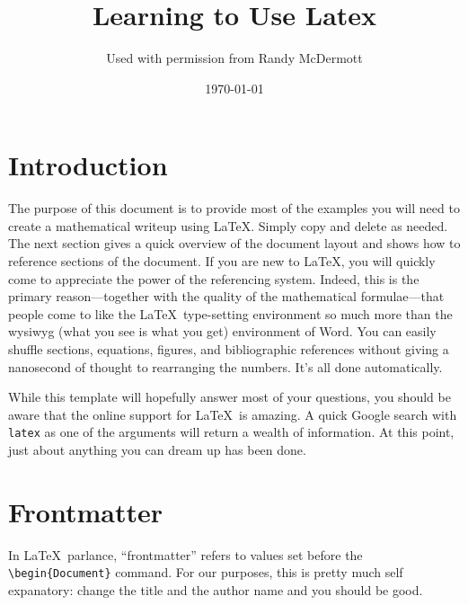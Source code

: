 \documentclass[12pt,letterpaper]{article}
\title{Learning to Use Latex}
\author{Used with permission from Randy McDermott}
\date{\today}
\begin{document}
\maketitle

\section{Introduction}
\label{sec:intro}

The purpose of this document is to provide most of the examples you will need to create a mathematical writeup using \LaTeX.  Simply copy and delete as needed.  The next section gives a quick overview of the document layout and shows how to reference sections of the document.  If you are new to \LaTeX, you will quickly come to appreciate the power of the referencing system.  Indeed, this is the primary reason---together with the quality of the mathematical formulae---that people come to like the \LaTeX~type-setting environment so much more than the wysiwyg (what you see is what you get) environment of Word.  You can easily shuffle sections, equations, figures, and bibliographic references without giving a nanosecond of thought to rearranging the numbers.  It's all done automatically.


While this template will hopefully answer most of your questions, you should be aware that the online support for \LaTeX~is amazing.  A quick Google search with \verb=latex= as one of the arguments will return a wealth of information.  At this point, just about anything you can dream up has been done.

\section{Frontmatter}
\label{sec:front}

In \LaTeX~parlance, ``frontmatter'' refers to values set before the \verb=\begin{Document}= command.  For our purposes, this is pretty much self expanatory: change the title and the author name and you should be good.
\end{document}
